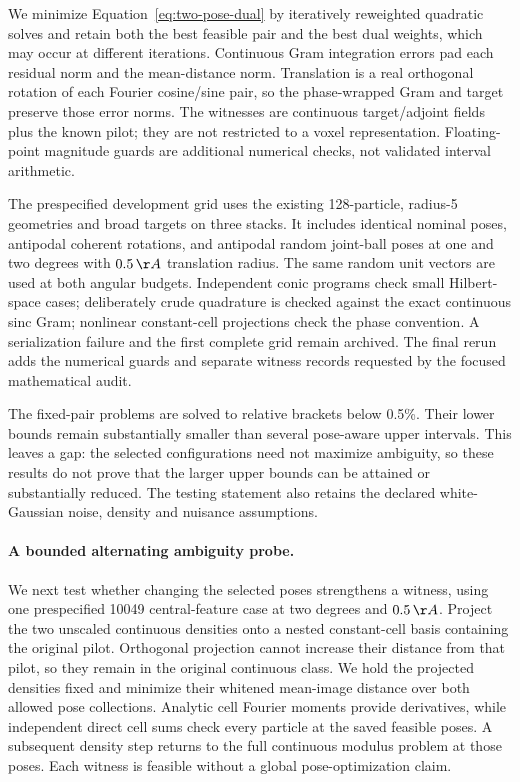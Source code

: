 We minimize Equation~\eqref{eq:two-pose-dual} by iteratively reweighted
quadratic solves and retain both the best feasible pair and the best dual
weights, which may occur at different iterations. Continuous Gram integration
errors pad each residual norm and the mean-distance norm. Translation is a
real orthogonal rotation of each Fourier cosine/sine pair, so the phase-wrapped
Gram and target preserve those error norms. The witnesses are continuous
target/adjoint fields plus the known pilot; they are not restricted to a voxel
representation. Floating-point magnitude guards are additional numerical
checks, not validated interval arithmetic.

The prespecified development grid uses the existing 128-particle, radius-5
geometries and broad targets on three stacks. It includes identical nominal
poses, antipodal coherent rotations, and antipodal random joint-ball poses at
one and two degrees with $0.5\,\AA$ translation radius. The same random unit
vectors are used at both angular budgets. Independent conic programs check
small Hilbert-space cases; deliberately crude quadrature is checked against
the exact continuous sinc Gram; nonlinear constant-cell projections check
the phase convention. A serialization failure and the first complete grid
remain archived. The final rerun adds the numerical guards and separate
witness records requested by the focused mathematical audit.


The fixed-pair problems are solved to relative brackets below 0.5\%. Their
lower bounds remain substantially smaller than several pose-aware upper
intervals. This leaves a gap: the selected configurations need not maximize
ambiguity, so these results do not prove that the larger upper bounds can be
attained or substantially reduced. The testing statement also retains the
declared white-Gaussian noise, density and nuisance assumptions.

\paragraph{A bounded alternating ambiguity probe.}
We next test whether changing the selected poses strengthens a witness, using
one prespecified 10049 central-feature case at two degrees and $0.5\,\AA$.
Project the two unscaled continuous densities onto a nested constant-cell basis
containing the original pilot. Orthogonal projection cannot increase their
distance from that pilot, so they remain in the original continuous class.
We hold the projected densities fixed and minimize their whitened mean-image
distance over both allowed pose collections. Analytic cell Fourier moments
provide derivatives, while independent direct cell sums check every particle
at the saved feasible poses. A subsequent density step returns to the full
continuous modulus problem at those poses. Each witness is feasible without
a global pose-optimization claim.


